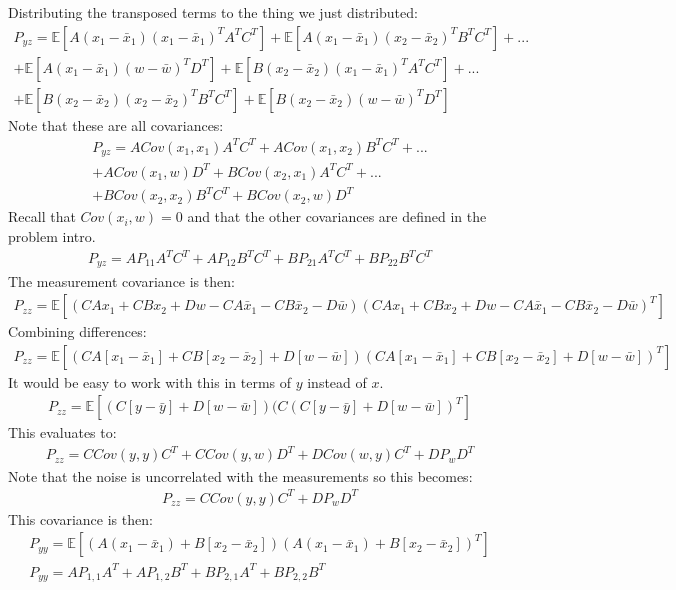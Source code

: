 \documentclass{article}
\begin{document}
Distributing the transposed terms to the thing we just distributed:
\begin{align*}
P_{yz} = \mathbb{E}[A(x_1-\bar{x}_1)(x_1-\bar{x}_1)^TA^TC^T] + \mathbb{E}[A(x_1-\bar{x}_1)(x_2-\bar{x}_2)^T B^T C^T] +...\\
+ \mathbb{E}[A(x_1-\bar{x}_1)(w-\bar{w})^T D^T] + \mathbb{E}[B(x_2-\bar{x}_2)(x_1-\bar{x}_1)^T A^T C^T] + ...\\ 
+ \mathbb{E}[B(x_2-\bar{x}_2)(x_2-\bar{x}_2)^T B^T C^T] + \mathbb{E}[B(x_2-\bar{x}_2)(w-\bar{w})^T D^T]
\end{align*}
Note that these are all covariances:
\begin{align*}
P_{yz} = A Cov(x_1,x_1) A^TC^T + A Cov(x_1,x_2) B^T C^T +...\\
+ A Cov(x_1,w) D^T + B Cov(x_2,x_1) A^T C^T + ...\\ 
+ B Cov(x_2,x_2) B^T C^T + B Cov(x_2,w) D^T
\end{align*}
Recall that $Cov(x_i,w)=0$ and that the other covariances are defined in the problem intro.
\begin{align*}
P_{yz} = A P_{11} A^TC^T + A P_{12} B^T C^T + B P_{21} A^T C^T + B P_{22} B^T C^T
\end{align*}
The measurement covariance is then:
\begin{align*}
P_{zz} = \mathbb{E}[(C A x_1 + C B x_2+ D w-CA\bar{x}_1 - CB\bar{x}_2 - D\bar{w})(C A x_1 + C B x_2+ D w-CA\bar{x}_1 - CB\bar{x}_2 - D\bar{w})^T]
\end{align*}
Combining differences:
\begin{align*}
P_{zz} = \mathbb{E}[(C A[x_1 - \bar{x}_1] + C B [x_2-\bar{x}_2]+ D [w - \bar{w}])(C A[x_1 - \bar{x}_1] + C B [x_2-\bar{x}_2]+ D [w - \bar{w}])^T]
\end{align*}
It would be easy to work with this in terms of $y$ instead of $x$.
\begin{align*}
P_{zz} = \mathbb{E}[(C [y-\bar{y}]+ D [w - \bar{w}])(C (C [y-\bar{y}]+ D [w - \bar{w}])^T]
\end{align*}
This evaluates to:
\begin{align*}
P_{zz} = C Cov(y,y) C^T + C Cov(y,w) D^T + D Cov(w,y) C^T + D P_w D^T
\end{align*}
Note that the noise is uncorrelated with the measurements so this becomes:
\begin{align*}
P_{zz} = C Cov(y,y) C^T + D P_w D^T
\end{align*}
This covariance is then:
\begin{align*}
P_{yy} = \mathbb{E}[(A (x_1-\bar{x}_1) + B [x_2-\bar{x}_2]) (A (x_1-\bar{x}_1) + B [x_2-\bar{x}_2])^T] \\
P_{yy} = A P_{1,1} A^T + A P_{1,2} B^T + BP_{2,1} A^T + BP_{2,2} B^T
\end{align*}
\end{document}

